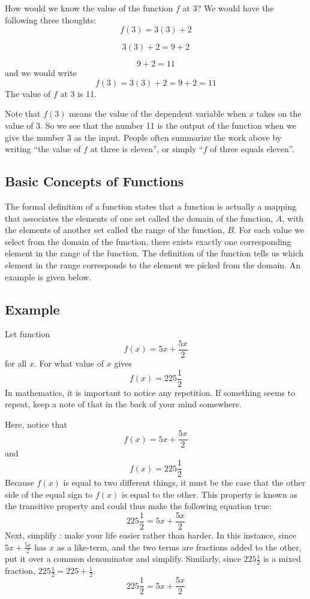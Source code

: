 How would we know the value of the function $f$ at 3? We would have the following three thoughts:
\[
f(3) = 3(3) + 2
\]

\[
3(3) + 2 = 9 + 2
\]

\[
9 + 2 = 11
\]
and we would write
\[
f(3) = 3(3) + 2 = 9 + 2 = 11
\]
The value of $f$ at 3 is 11.

Note that $f(3)$ means the value of the dependent variable when $x$ takes on the value of 3. So we see that the number 11 is the output of the function when we give the number 3 as the input. People often summarize the work above by writing ``the value of $f$ at three is eleven'', or simply ``$f$ of three equals eleven''.

\subsection{Basic Concepts of Functions}
\label{sss:basi-1380}

The formal definition of a function states that a function is actually a mapping that associates the elements of one set called the domain of the function, $A$, with the elements of another set called the range of the function, $B$. For each value we select from the domain of the function, there exists exactly one corresponding element in the range of the function. The definition of the function tells us which element in the range corresponds to the element we picked from the domain. An example is given below.

\subsection{Example}
\label{sss:exam-1a79}

Let function
\[
f(x) = 5x + \frac{5x}{2}
\]
for all $x$. For what value of $x$ gives 
\[
f(x) = 225 \frac{1}{2}
\]
In mathematics, it is important to notice any repetition. If something seems to repeat,
keep a note of that in the back of your mind somewhere.

Here, notice that
\[
f(x) = 5x + \frac{5x}{2}
\]
and
\[
f(x) = 225 \frac{1}{2}
\]
Because $f(x)$ is equal to two different things, it must be the case that the other side of the equal sign to $f(x)$ is equal to the other. This property is known as the transitive property and could thus make the following equation true:
\[
225 \frac{1}{2} = 5x + \frac{5x}{2}
\]
Next, simplify :  make your life easier rather than harder. In this instance, since $5x + \frac{5x}{2}$ has $x$ as a like-term, and the two terms are fractions added to the other, put it over a common denominator and simplify. Similarly, since $225 \frac{1}{2}$ is a mixed fraction, $225 \frac{1}{2} = 225 + \frac{1}{2}$.
\[
225 \frac{1}{2} = 5x + \frac{5x}{2}
\]

